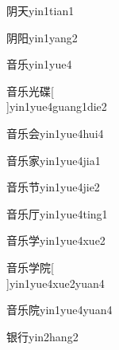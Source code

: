 \begin{verbete}[6;4]{阴天}{yin1tian1}
\end{verbete}

\begin{verbete*}[6;6]{阴阳}{yin1yang2}
\end{verbete*}

\begin{verbete}[9;5]{音乐}{yin1yue4}
\end{verbete}

\begin{verbete}[9;5;6;14]{音乐光碟}[\\]{yin1yue4guang1die2}
\end{verbete}

\begin{verbete}[9;5;6]{音乐会}{yin1yue4hui4}
\end{verbete}

\begin{verbete}[9;5;10]{音乐家}{yin1yue4jia1}
\end{verbete}

\begin{verbete}[9;5;5]{音乐节}{yin1yue4jie2}
\end{verbete}

\begin{verbete}[9;5;4]{音乐厅}{yin1yue4ting1}
\end{verbete}

\begin{verbete}[9;5;8]{音乐学}{yin1yue4xue2}
\end{verbete}

\begin{verbete}[9;5;8;10]{音乐学院}[\\]{yin1yue4xue2yuan4}
\end{verbete}

\begin{verbete}[9;5;10]{音乐院}{yin1yue4yuan4}
\end{verbete}

\begin{verbete}[11;6]{银行}{yin2hang2}
\end{verbete}

